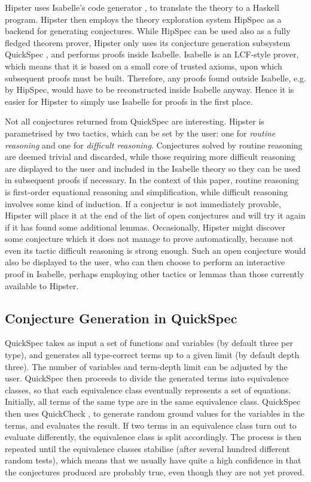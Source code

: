 Hipster uses Isabelle's code generator \cite{codegen2}, to translate the theory to a Haskell program.
%
Hipster then employs the theory exploration system HipSpec as a backend for generating conjectures.
%
While HipSpec can be used also as a fully fledged theorem prover, Hipster only uses its conjecture generation subsystem QuickSpec \cite{quickspec}, and performs proofs inside Isabelle.
%
Isabelle is an LCF-style prover, which means that it is based on a small core of trusted axioms, upon which subsequent proofs must be built.
%
Therefore, any proofs found outside Isabelle, e.g. by HipSpec, would have to be reconstructed inside Isabelle anyway.
%
Hence it is easier for Hipster to simply use Isabelle for proofs in the first place. 

Not all conjectures returned from QuickSpec are interesting.
%
Hipster is parametrised by two tactics, which can be set by the user: one for \emph{routine reasoning} and one for \emph{difficult reasoning}.
%
Conjectures solved by routine reasoning are deemed trivial and discarded, while those requiring more difficult reasoning are displayed to the user and included in the Isabelle theory so they can be used in subsequent proofs if necessary.
%
In the context of this paper, routine reasoning is first-order equational reasoning and simplification, while difficult reasoning involves some kind of induction. If a conjectur is not immediately provable, Hipster will place it at the end of the list of open conjectures and will try it again if it has found some additional lemmas.
%
Occasionally, Hipster might discover some conjecture which it does not manage to prove automatically, because not even its tactic difficult reasoning is strong enough. Such an open conjecture would also be displayed to the user, who can then choose to perform an interactive proof in Isabelle, perhaps employing other tactics or lemmas than those currently available to Hipster.


\subsection{Conjecture Generation in QuickSpec}
QuickSpec takes as input a set of functions and variables (by default three per type), and generates all type-correct terms up to a given limit (by default depth three).
%
The number of variables and term-depth limit can be adjusted by the user.
%
QuickSpec then proceeds to divide the generated terms into equivalence classes, so that each equivalence class eventually represents a set of equations.
%
Initially, all terms of the same type are in the same equivalence class. QuickSpec then uses QuickCheck \cite{quickcheck}, to generate random ground values for the variables in the terms, and evaluates the result.
%
If two terms in an equivalence class turn out to evaluate differently, the equivalence class is split accordingly.
%
The process is then repeated until the equivalence classes stabilise (after several hundred different random tests), which means that we usually have quite a high confidence in that the conjectures produced are probably true, even though they are not yet proved.  

